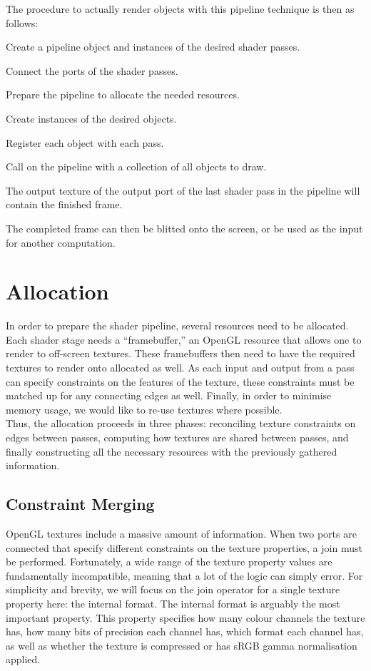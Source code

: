 \documentclass[format=sigconf]{acmart}
\begin{document}
The procedure to actually render objects with this pipeline technique is then as follows:

\begin{step}
\item Create a pipeline object and instances of the desired shader passes.
\item Connect the ports of the shader passes.
\item Prepare the pipeline to allocate the needed resources.
\item Create instances of the desired objects.
\item Register each object with each pass.
\item Call  on the pipeline with a collection of all objects to draw.
\item The output texture of the output port of the last shader pass in the pipeline will contain the finished frame.
\end{step}

The completed frame can then be blitted onto the screen, or be used as the input for another computation.

\section{Allocation}\label{allocation}
In order to prepare the shader pipeline, several resources need to be allocated. Each shader stage needs a ``framebuffer,'' an OpenGL resource that allows one to render to off-screen textures. These framebuffers then need to have the required textures to render onto allocated as well. As each input and output from a pass can specify constraints on the features of the texture, these constraints must be matched up for any connecting edges as well. Finally, in order to minimise memory usage, we would like to re-use textures where possible. \\

Thus, the allocation proceeds in three phases: reconciling texture constraints on edges between passes, computing how textures are shared between passes, and finally constructing all the necessary resources with the previously gathered information.

\subsection{Constraint Merging}\label{texture-constraints}
OpenGL textures include a massive amount of information\cite{texparameter}\cite{teximage2d}. When two ports are connected that specify different constraints on the texture properties, a join must be performed. Fortunately, a wide range of the texture property values are fundamentally incompatible, meaning that a lot of the logic can simply error. For simplicity and brevity, we will focus on the join operator for a single texture property here: the internal format. The internal format is arguably the most important property. This property specifies how many colour channels the texture has, how many bits of precision each channel has, which format each channel has, as well as whether the texture is compressed or has sRGB gamma normalisation applied. \\
\end{document}

